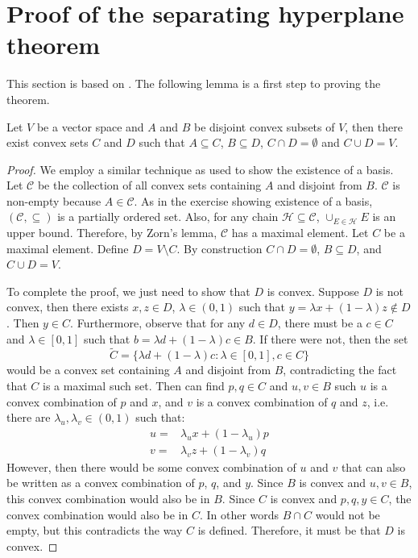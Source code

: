 \clearpage
\appendix
\section{Proof of the separating hyperplane theorem \label{app:hyperplane}}

This section is based on \cite{holmes1975}.  The following lemma is a
first step to proving the theorem.
\begin{lemma}[Stone]\label{lem:stone}
  Let $V$ be a vector space and $A$ and $B$ be disjoint convex subsets
  of $V$, then there exist convex sets $C$ and $D$ such that $A
  \subseteq C$, $B \subseteq D$, $C \cap D = \emptyset$ and $C \cup D
  = V$.
\end{lemma}
\begin{proof}
  We employ a similar technique as used to show the existence of a
  basis. Let $\mathcal{C}$ be the collection of all convex sets
  containing $A$ and disjoint from $B$. $\mathcal{C}$ is non-empty
  because $A \in \mathcal{C}$.  As in the exercise showing existence
  of a basis, $(\mathcal{C}, \subseteq)$ is a partially ordered
  set. Also, for any chain $\mathcal{H} \subseteq \mathcal{C}$,
  $\cup_{E \in \mathcal{H}} E$ is an upper bound. Therefore, by Zorn's
  lemma, $\mathcal{C}$ has a maximal element. Let $C$ be a maximal
  element. Define $D = V \setminus C$.  By construction
  $C \cap D = \emptyset$, $B \subseteq D$, and $C \cup D = V$.

  To complete the proof, we just need to show that $D$ is
  convex. Suppose $D$ is not convex, then there exists $x,z \in D$,
  $\lambda \in (0,1)$ such that $y = \lambda x + (1-\lambda) z \not\in
  D$. Then $y \in C$. Furthermore, observe that for any $d \in D$, there
  must be a $c \in C$ and $\lambda \in [0,1]$ such that $b = \lambda d
  + (1-\lambda) c \in B$. If there were not, then the set 
  \[ \tilde{C} = \{\lambda d + (1-\lambda) c:  \lambda \in [0,1], c
  \in C\} \]
  would be a convex set containing $A$ and disjoint from $B$,
  contradicting the fact that $C$ is a maximal such set. 
  Then can find $p,q \in C$ and $u,v \in B$ such $u$ is a convex
  combination of $p$ and $x$, and $v$ is a convex combination of $q$
  and $z$, i.e. there are $\lambda_u, \lambda_v \in (0,1)$ such that:
  \begin{align*}
    u = & \lambda_u x + (1-\lambda_u) p \\
    v = & \lambda_v z + (1-\lambda_v) q 
  \end{align*}
  However, then there would be some convex combination of $u$ and $v$
  that can also be written as a convex combination of $p$, $q$, and
  $y$. Since $B$ is convex and $u,v\in B$, this convex combination
  would also be in $B$. Since $C$ is convex and $p,q,y \in C$, the
  convex combination would also be in $C$. In other words $B \cap C$
  would not be empty, but this contradicts the way $C$ is
  defined. Therefore, it must be that $D$ is convex. 
\end{proof}
